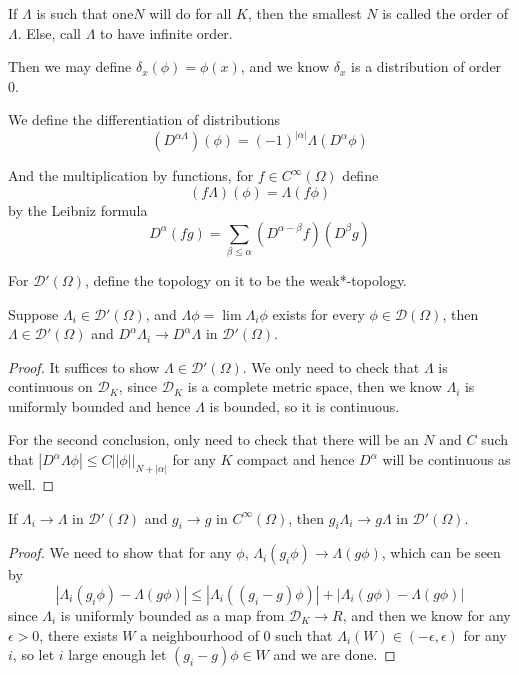 \documentclass[lang=en, color=blue, ]{elegantbook}
\newcommand{\D}{\mathscr{D}}
\begin{document}
\begin{definition}
    If $\Lambda$ is such that one$N$ will do for all $K$, then the smallest $N$ is called the order of $\Lambda$. Else, call $\Lambda$ to have infinite order.\par
    Then we may define $\delta_x(\phi) = \phi(x)$, and we know $\delta_x$ is a distribution of order $0$.
\end{definition}

\begin{definition}
    We define the differentiation of distributions
    \[(D^{\alpha\Lambda})(\phi) = (-1)^{|\alpha|}\Lambda(D^{\alpha} \phi)\]\par
    And the multiplication by functions, for $f \in C^{\infty}(\Omega)$ define
    \[
    (f\Lambda)(\phi) = \Lambda(f\phi)
    \]
    by the Leibniz formula
    \[
    D^{\alpha}(fg) = \sum_{\beta \leq \alpha}(D^{\alpha-\beta}f)(D^{\beta }g)
    \]
\end{definition}

\begin{definition}
    For $\D'(\Omega)$, define the topology on it to be the weak*-topology.
\end{definition}

\begin{theorem}
    Suppose $\Lambda_i \in \D'(\Omega)$, and $\Lambda \phi = \lim \Lambda_i \phi$ exists for every $\phi \in \D(\Omega)$, then $\Lambda \in \D'(\Omega)$ and $D^{\alpha}\Lambda_i \to D^{\alpha}\Lambda$ in $\D'(\Omega)$.
\end{theorem}
\begin{proof}
    It suffices to show $\Lambda \in \D'(\Omega)$. We only need to check that $\Lambda$ is continuous on $\D_K$, since $\D_K$ is a complete metric space, then we know $\Lambda_i$ is uniformly bounded and hence $\Lambda$ is bounded, so it is continuous.\par
    For the second conclusion, only need to check that there will be an $N$ and $C$ such that $|D^{\alpha}\Lambda \phi| \leq C||\phi||_{N+|\alpha|}$ for any $K$ compact and hence $D^{\alpha}$ will be continuous as well.
\end{proof}

\begin{theorem}
    If $\Lambda_i \to \Lambda$ in $\D'(\Omega)$ and $g_i \to g$ in $C^{\infty}(\Omega)$, then $g_i\Lambda_i \to g\Lambda$ in $\D'(\Omega)$.
\end{theorem}
\begin{proof}
    We need to show that for any $\phi$, $\Lambda_i(g_i \phi) \to \Lambda(g\phi)$, which can be seen by
    \[
    |\Lambda_i(g_i \phi) - \Lambda(g\phi)| \leq |\Lambda_i((g_i-g)\phi)| + |\Lambda_i(g\phi) - \Lambda(g\phi)|
    \]
    since $\Lambda_i$ is uniformly bounded as a map from $\D_K \to R$, and then we know for any $\epsilon > 0$, there exists $W$ a neighbourhood of $0$ such that $\Lambda_i(W) \in (-\epsilon,\epsilon)$ for any $i$, so let $i$ large enough let $(g_i-g)\phi \in W$ and we are done. 
\end{proof}
\end{document}
